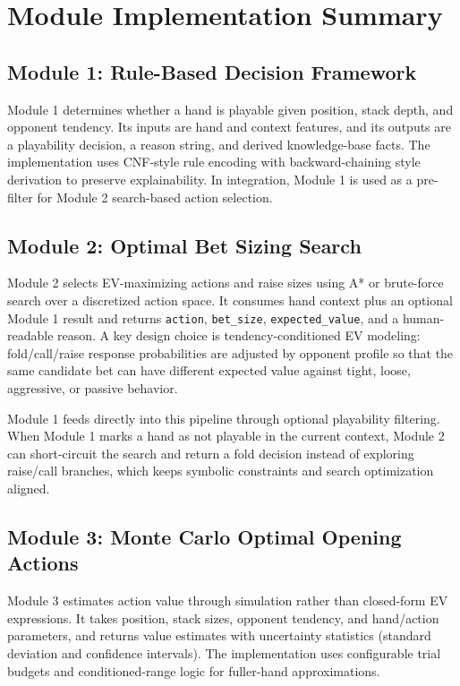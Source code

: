 \documentclass[11pt]{article}
\begin{document}
\section{Module Implementation Summary}

\subsection{Module 1: Rule-Based Decision Framework}
Module 1 determines whether a hand is playable given position, stack depth, and opponent tendency. Its inputs are hand and context features, and its outputs are a playability decision, a reason string, and derived knowledge-base facts. The implementation uses CNF-style rule encoding with backward-chaining style derivation to preserve explainability. In integration, Module 1 is used as a pre-filter for Module 2 search-based action selection.

\subsection{Module 2: Optimal Bet Sizing Search}
Module 2 selects EV-maximizing actions and raise sizes using A* or brute-force search over a discretized action space. It consumes hand context plus an optional Module 1 result and returns \texttt{action}, \texttt{bet\_size}, \texttt{expected\_value}, and a human-readable reason. A key design choice is tendency-conditioned EV modeling: fold/call/raise response probabilities are adjusted by opponent profile so that the same candidate bet can have different expected value against tight, loose, aggressive, or passive behavior.

Module 1 feeds directly into this pipeline through optional playability filtering. When Module 1 marks a hand as not playable in the current context, Module 2 can short-circuit the search and return a fold decision instead of exploring raise/call branches, which keeps symbolic constraints and search optimization aligned.

\subsection{Module 3: Monte Carlo Optimal Opening Actions}
Module 3 estimates action value through simulation rather than closed-form EV expressions. It takes position, stack sizes, opponent tendency, and hand/action parameters, and returns value estimates with uncertainty statistics (standard deviation and confidence intervals). The implementation uses configurable trial budgets and conditioned-range logic for fuller-hand approximations.
\end{document}

